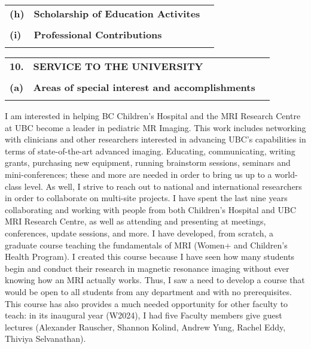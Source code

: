 \documentclass[11pt,notitlepage,english]{report}
\begin{document}
\begin{tabular}{L{.5cm} L{12cm} L{6.9cm}}
  \\
  \textbf{(h)} & \textbf{Scholarship of Education Activites} \\
  \\
  \textbf{(i)} & \textbf{Professional Contributions} \\
  \\
\end{tabular}



\begin{tabular}{L{.5cm} L{12cm} L{6.9cm}}
  \textbf{10.}  & \textbf{SERVICE TO THE UNIVERSITY}                                      \\
  \\
  \textbf{(a)} & \textbf{Areas of special interest and accomplishments} \\
  \\
\end{tabular}
\label{10. Service to University}

I am interested in helping BC Children's Hospital and the MRI Research Centre at UBC
become a leader in pediatric MR Imaging. This work includes networking with clinicians and other researchers interested 
in advancing UBC's capabilities in terms of state-of-the-art advanced imaging. 
Educating, communicating, writing grants, purchasing new equipment, running brainstorm sessions, seminars and mini-conferences; 
these and more are needed in order to bring us up to a world-class level. 
As well, I strive to reach out to national and international researchers in order to collaborate on multi-site projects. 
I have spent the last nine years collaborating and working with people from both Children's Hospital and UBC MRI Research Centre,
as well as attending and presenting at meetings, conferences, update sessions, and more. 
I have developed, from scratch, a graduate course teaching the fundamentals of MRI (Women+ and Children's Health Program).
I created this course because I have seen how many students begin and conduct their research in magnetic resonance imaging without ever knowing how an MRI actually works.
Thus, I saw a need to develop a course that would be open to all students from any department and with no prerequisites.
This course has also provides a much needed opportunity for other faculty to teach: in its inaugural year (W2024), I had five Faculty members give guest lectures (Alexander Rauscher, Shannon Kolind, Andrew Yung, Rachel Eddy, Thiviya Selvanathan).
\end{document}
